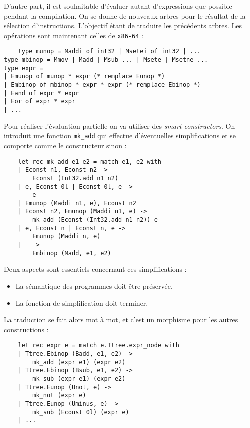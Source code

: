 \documentclass{cours}
\begin{document}
D'autre part, il est souhaitable d'évaluer autant d'expressions que possible pendant la compilation.
On se donne de nouveaux arbres pour le résultat de la sélection d'instructions. L'objectif étant de traduire les précédents arbres. Les opérations sont maintenant celles de \texttt{x86-64} :
\begin{verbatim}
    type munop = Maddi of int32 | Msetei of int32 | ...
type mbinop = Mmov | Madd | Msub ... | Msete | Msetne ...
type expr =
| Emunop of munop * expr (* remplace Eunop *)
| Embinop of mbinop * expr * expr (* remplace Ebinop *)
| Eand of expr * expr
| Eor of expr * expr
| ...
\end{verbatim}

Pour réaliser l'évaluation partielle on va utiliser des \textit{smart constructors}. On introduit une fonction \texttt{mk\_add} qui effectue d'éventuelles simplifications et se comporte comme le constructeur sinon :
\begin{verbatim}
    let rec mk_add e1 e2 = match e1, e2 with
    | Econst n1, Econst n2 ->
        Econst (Int32.add n1 n2)
    | e, Econst 0l | Econst 0l, e ->
        e
    | Emunop (Maddi n1, e), Econst n2
    | Econst n2, Emunop (Maddi n1, e) ->
        mk_add (Econst (Int32.add n1 n2)) e
    | e, Econst n | Econst n, e ->
        Emunop (Maddi n, e)
    | _ ->
        Embinop (Madd, e1, e2)
\end{verbatim}

Deux aspects sont essentiels concernant ces simplifications :
\begin{itemize}
    \item La sémantique des programmes doit être préservée.
    \item La fonction de simplification doit terminer.
\end{itemize}
La traduction se fait alors mot à mot, et c'est un morphisme pour les autres constructions :
\begin{verbatim}
    let rec expr e = match e.Ttree.expr_node with
    | Ttree.Ebinop (Badd, e1, e2) ->
        mk_add (expr e1) (expr e2)
    | Ttree.Ebinop (Bsub, e1, e2) ->
        mk_sub (expr e1) (expr e2)
    | Ttree.Eunop (Unot, e) ->
        mk_not (expr e)
    | Ttree.Eunop (Uminus, e) ->
        mk_sub (Econst 0l) (expr e)
    | ...
\end{verbatim}
\end{document}
